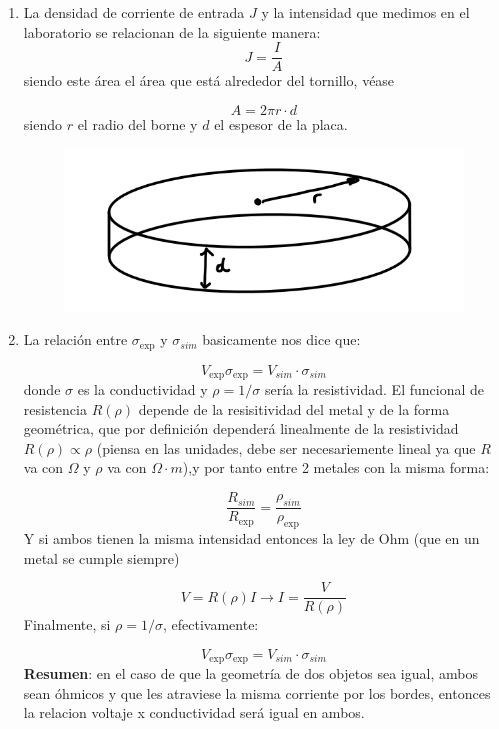 \begin{enumerate}[label=\alph*)]
	\item La densidad de corriente de entrada $J$ y la intensidad que medimos en el laboratorio se relacionan de la siguiente manera:
	      \begin{equation*}
		      J = \frac{I}{A}
	      \end{equation*}
	siendo este área el área que está alrededor del tornillo, véase

	      \begin{equation}
		      A = 2 \pi r \cdot d
	      \end{equation}
	siendo $r$ el radio del borne y $d$ el espesor de la placa.
    \begin{figure}[H] \centering
        \includegraphics[width=0.6\linewidth]{Cuerpo/Ch_02/Examen_24_3.png} 
    \end{figure}
	\item La relación entre $\sigma_{\exp}$ y $\sigma_{sim}$ basicamente nos dice que:
	
	\begin{equation*}
         V_{\exp} \sigma_{\exp} = V_{sim} \cdot \sigma_{sim}
    \end{equation*}
    donde $\sigma$ es la conductividad y $\rho=1/\sigma$ sería la resistividad. El funcional de resistencia $R(\rho)$ depende de la resisitividad del metal y de la forma geométrica, que por definición dependerá linealmente de la resistividad $R(\rho) \propto \rho$ (piensa en las unidades, debe ser necesariemente lineal ya que $R$ va con $\Omega$ y $\rho$ va con $\Omega \cdot m$),y por tanto entre 2 metales con la misma forma:

    \begin{equation}
        \frac{R_{sim}}{R_{\exp}} = \frac{\rho_{sim}}{\rho_{\exp}}
    \end{equation}  
    Y si ambos tienen la misma intensidad entonces la ley de Ohm (que en un metal se cumple siempre)

    \begin{equation*}
        V = R(\rho) I \longrightarrow I = \frac{V}{R(\rho)} 
    \end{equation*}
    Finalmente, si $\rho = 1/\sigma$, efectivamente:

	\begin{equation*}
        V_{\exp} \sigma_{\exp} = V_{sim} \cdot \sigma_{sim}
   \end{equation*}
   \textbf{Resumen}: en el caso de que la geometría de dos objetos sea igual, ambos sean óhmicos y que les atraviese la misma corriente por los bordes, entonces la relacion voltaje x conductividad será igual en ambos. 
\end{enumerate}

